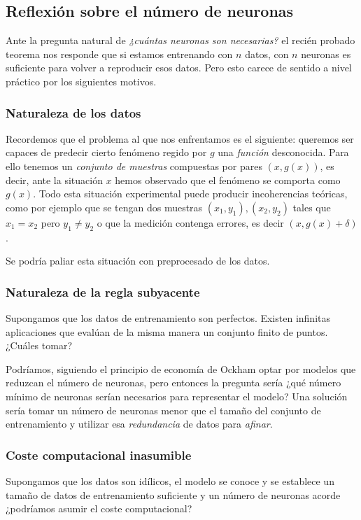 
\subsection{Reflexión sobre el número de neuronas} \label{subsection:reflexión_sobre_número_de_neuronas}

Ante la pregunta natural de 
\textit{¿cuántas neuronas son necesarias?} el 
recién probado teorema nos responde que 
si estamos entrenando con $n$ datos, con $n$ neuronas es suficiente para volver a reproducir esos datos. Pero esto carece de sentido a nivel práctico por los siguientes motivos. 

\subsubsection*{Naturaleza de los datos}  
Recordemos que el problema al que nos enfrentamos es el siguiente:
queremos ser capaces de predecir cierto fenómeno regido por $g$ una \textit{función} desconocida. 
Para ello tenemos un \textit{conjunto de muestras} 
compuestas por pares $(x, g(x))$, es decir, ante la situación $x$
hemos observado que el fenómeno se comporta como $g(x)$. Todo esta 
situación experimental puede producir incoherencias teóricas, como por ejemplo que se tengan dos muestras $(x_1, y_1), (x_2, y_2)$ 
tales que $x_1 = x_2$ pero $y_1 \neq y_2$ o que la medición contenga errores, es decir $(x, g(x)+\delta)$. 

Se podría paliar esta situación con preprocesado de los datos. 

\subsubsection*{ Naturaleza de la regla subyacente}  

Supongamos que los datos de entrenamiento son perfectos. Existen infinitas aplicaciones 
que evalúan de la misma manera un conjunto finito de puntos. 
¿Cuáles tomar?

Podríamos, siguiendo el principio de economía de Ockham optar
por modelos que reduzcan el número de neuronas, pero entonces la 
pregunta sería  ¿qué número mínimo de neuronas serían necesarios para representar el modelo? 
Una solución sería tomar un número de neuronas menor que el tamaño del conjunto de 
entrenamiento y utilizar esa \textit{redundancia} de datos para 
\textit{afinar}. 

\subsubsection*{Coste computacional inasumible}  
Supongamos que los datos son idílicos, el modelo se conoce y se establece un tamaño de datos de entrenamiento suficiente y
un número de neuronas acorde  ¿podríamos asumir el coste computacional?


